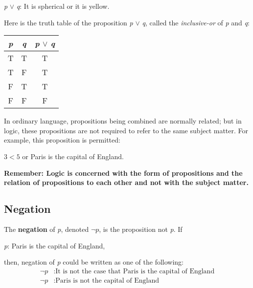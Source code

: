 \begin{center}
    \textit{p} $\vee$ \textit{q}: It is spherical or it is yellow.
\end{center}

Here is the truth table of the proposition \textit{p} $\vee$ \textit{q}, called the \textit{inclusive-or} of \textit{p} and \textit{q}:

\begin{table}[h]
\centering
\begin{tabular}{|c|c|c|}
\hline
\textit{p} & \textit{q} & \textit{p} $\vee$ \textit{q} \\ \hline
T          & T          & T       \\ \hline
T          & F          & T       \\ \hline
F          & T          & T       \\ \hline
F          & F          & F       \\ \hline
\end{tabular}
\end{table}

In ordinary language, propositions being combined are normally related; but in logic, these propositions are not required to refer to the same subject matter.  For example, this proposition is permitted:

\begin{center}
$3 < 5$ or Paris is the capital of England.
\end{center}

\textbf{Remember: Logic is concerned with the form of propositions and the relation of propositions to each other and not with the subject matter.}

\subsection*{Negation}

The \textbf{negation} of \textit{p}, denoted $\lnot p$, is the proposition not \textit{p}.  If

\begin{center}
\textit{p}: Paris is the capital of England,
\end{center}

then, negation of \textit{p} could be written as one of the following:
\begin{align*}
    \lnot p&: \text{It is not the case that Paris is the capital of England}\\
    \lnot p&: \text{Paris is not the capital of England}
\end{align*}

